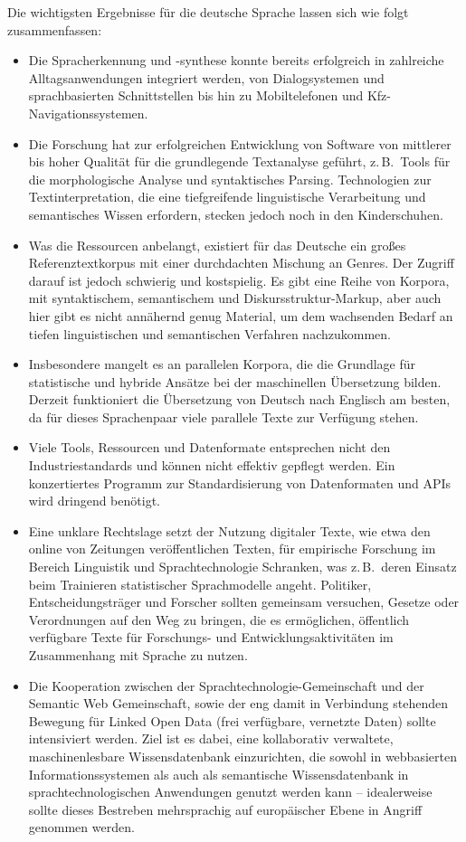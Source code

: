 \begin{multicols}{2}
Die wichtigsten Ergebnisse für die deutsche Sprache lassen sich wie folgt zusammenfassen:

\begin{itemize}
\item Die Spracherkennung und -synthese konnte bereits erfolgreich in zahlreiche Alltagsanwendungen integriert werden, von Dialogsystemen und sprachbasierten Schnittstellen bis hin zu Mobiltelefonen und Kfz-Navigationssystemen.
\item Die Forschung hat zur erfolgreichen Entwicklung von Software von mittlerer bis hoher Qualität für die grundlegende Textanalyse geführt, z.\,B.~Tools für die morphologische Analyse und syntaktisches Parsing. Technologien zur Textinterpretation, die eine tiefgreifende linguistische Verarbeitung und semantisches Wissen erfordern, stecken jedoch noch in den Kinderschuhen.
\item Was die Ressourcen anbelangt, existiert für das Deutsche ein großes Referenztextkorpus mit einer durchdachten Mischung an Genres. Der Zugriff darauf ist jedoch schwierig und kostspielig. Es gibt eine Reihe von Korpora, mit syntaktischem, semantischem und Diskursstruktur-Markup, aber auch hier gibt es nicht annähernd genug Material, um dem wachsenden Bedarf an tiefen linguistischen und semantischen Verfahren nachzukommen.
\item Insbesondere mangelt es an parallelen Korpora, die die Grundlage für statistische und hybride Ansätze bei der maschinellen Übersetzung bilden. Derzeit funktioniert die Übersetzung von Deutsch nach Englisch am besten, da für dieses Sprachenpaar viele parallele Texte zur Verfügung stehen.
\item Viele Tools, Ressourcen und Datenformate entsprechen nicht den Industriestandards und können nicht effektiv gepflegt werden. Ein konzertiertes Programm zur Standardisierung von Datenformaten und APIs wird dringend benötigt.
\item Eine unklare Rechtslage setzt der Nutzung digitaler Texte, wie etwa den online von Zeitungen veröffentlichen Texten, für empirische Forschung im Bereich Linguistik und Sprachtechnologie Schranken, was z.\,B.~deren Einsatz beim Trainieren statistischer Sprachmodelle angeht. Politiker, Entscheidungsträger und Forscher sollten gemeinsam versuchen, Gesetze oder Verordnungen auf den Weg zu bringen, die es ermöglichen, öffentlich verfügbare Texte für Forschungs- und Entwicklungsaktivitäten im Zusammenhang mit Sprache zu nutzen.
\item Die Kooperation zwischen der Sprach\-tech\-no\-lo\-gie-Ge\-mein\-schaft und der Semantic Web Gemeinschaft, sowie der eng damit in Verbindung stehenden Bewegung für Linked Open Data (frei verfügbare, vernetzte Daten) sollte intensiviert werden. Ziel ist es dabei, eine kollaborativ verwaltete, maschinenlesbare Wissensdatenbank einzurichten, die sowohl in webbasierten Informationssystemen als auch als semantische Wissensdatenbank in sprachtechnologischen Anwendungen genutzt werden kann -- idealerweise sollte dieses Bestreben mehrsprachig auf europäischer Ebene in Angriff genommen werden.	
\end{itemize}


\end{multicols}
